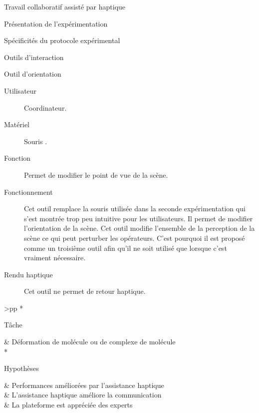 \documentclass[myfrancais,ngerman,english,french]{mythesis}
\begin{document}
\begin{mychapter}{Travail collaboratif assisté par haptique}
\begin{mysection}{Présentation de l'expérimentation}
\begin{mysubsection}{Spécificités du protocole expérimental}
\begin{mysubsubsection}{Outils d'interaction}
\begin{myparagraph}{Outil d'orientation}
						\begin{description}
							\item[Utilisateur] Coordinateur.
							\item[Matériel] Souris \myUSB.
							\item[Fonction] Permet de modifier le point de vue de la scène.
							\item[Fonctionnement]
								Cet outil remplace la souris \myThreeD utilisée dans la seconde expérimentation qui s'est montrée trop peu intuitive pour les utilisateurs.
								Il permet de modifier l'orientation de la scène.
								Cet outil modifie l'ensemble de la perception de la scène ce qui peut perturber les opérateurs.
								C'est pourquoi il est proposé comme un troisième outil afin qu'il ne soit utilisé que lorsque c'est vraiment nécessaire.
							\item[Rendu haptique]
								Cet outil ne permet de retour haptique.
						\end{description}
					\end{myparagraph}
				\end{mysubsubsection}
				\begin{mytable}
					\newcommand{\mytitlecolumn}[2]{%
						\multirow{#1}*{%
							\begin{minipage}{6em}%
								\raggedleft #2%
							\end{minipage}%
						}
					}
					\newlength{\expfourfirstcolumn}
					\newlength{\expfoursecondcolumn}
					\setlength{\expfourfirstcolumn}{7em}
					\setlength{\expfoursecondcolumn}{\textwidth}
					\addtolength{\expfoursecondcolumn}{-\expfourfirstcolumn}
					\addtolength{\expfoursecondcolumn}{-4\tabcolsep}
					\begin{mytabular}{>{\bfseries}p{\expfourfirstcolumn}p{\expfoursecondcolumn}}
						\mytoprule
						\mytitlecolumn{1}{Tâche}                   & Déformation de molécule ou de complexe de molécule                 \\
						\mymiddlerule[\heavyrulewidth]
						\mytitlecolumn{3}{Hypothèses}              &  Performances améliorées par l'assistance haptique \\
						                                           &  L'assistance haptique améliore la communication   \\
						                                           &  La plateforme est appréciée des experts          \\

\end{mytabular}
\end{mytable}
\end{mysubsection}
\end{mysection}
\end{mychapter}
\end{document}
